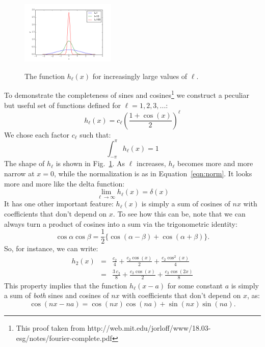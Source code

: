 \documentclass[12pt]{book}
\begin{document}
\begin{figure}[thb]
\begin{center}
{\includegraphics[width=0.40\textwidth]{figs/hk.png}}
\end{center}
\caption{\label{fig:hl} The function $h_\ell(x)$ for increasingly large values of $\ell$.}
\end{figure}

\noindent
To demonstrate the completeness of sines and cosines\footnote{This proof taken from http://web.mit.edu/jorloff/www/18.03-esg/notes/fourier-complete.pdf} we construct a peculiar but useful set of functions defined for $\ell=1,2,3,...$:
\begin{displaymath}
h_\ell(x) = c_\ell \left(\frac{1 + \cos(x)}{2}\right)^\ell
\end{displaymath}
We chose each factor $c_\ell$ such that:
\begin{displaymath}
\int_{-\pi}^{\pi} h_\ell(x) = 1
\end{displaymath}
The shape of $h_\ell$ is shown in Fig.~\ref{fig:hl}.  As $\ell$ increases, $h_\ell$ becomes more and more narrow at $x=0$, while the normalization is as in Equation~\ref{eqn:norm}.  It looks more and more like the delta function:
\begin{displaymath}
\lim_{\ell \to \infty} h_\ell(x) = \delta(x)
\end{displaymath}
It has one other important feature:  $h_\ell(x)$ is simply a sum of cosines of $nx$ with coefficients that don't depend on $x$.  To see how this can be, note that we can always turn a product of cosines into a sum via the trigonometric identity:
\begin{displaymath}
\cos \alpha \cos \beta = \frac{1}{2} \{\cos(\alpha - \beta) + \cos(\alpha + \beta)\}.
\end{displaymath}
So, for instance, we can write:
\begin{eqnarray*}
h_2(x) &=& \frac{c_2}{4} + \frac{c_2\cos(x)}{2}+\frac{c_2\cos^2(x)}{4} \\
           &=& \frac{3\,c_2}{8} + \frac{c_2\cos(x)}{2}+\frac{c_2\cos(2x)}{8}
\end{eqnarray*}
This property implies that the function $h_\ell(x-a)$ for some constant $a$ is simply a sum of {\em both} sines and cosines of $nx$ with coefficients that don't depend on $x$, as:
\begin{displaymath}
\cos(nx-na) = \cos(nx)\cos(na) + \sin(nx)\sin(na).
\end{displaymath}
\end{document}
